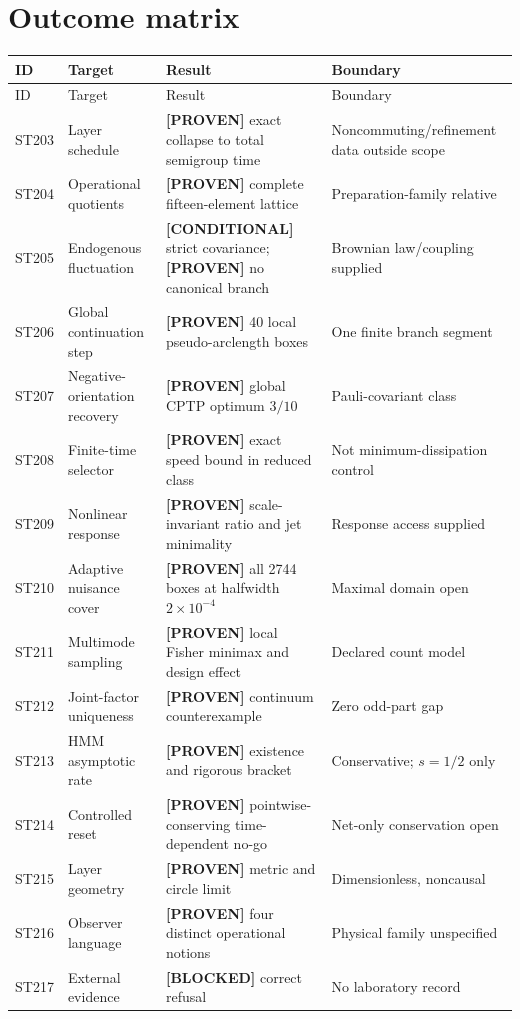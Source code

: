 \documentclass[11pt,a4paper]{article}
\newcommand{\proven}{\textcolor{green!40!black}{\textbf{[PROVEN]}}}
\newcommand{\conditional}{\textcolor{violet!65!black}{\textbf{[CONDITIONAL]}}}
\newcommand{\blocked}{\textcolor{orange!82!black}{\textbf{[BLOCKED]}}}
\begin{document}
\section{Outcome matrix}
\small
\begin{longtable}{@{}p{}p{}p{}p{}@{}}
\toprule ID & Target & Result & Boundary\\\midrule\endfirsthead
\toprule ID & Target & Result & Boundary\\\midrule\endhead
ST203 & Layer schedule & \proven{} exact collapse to total semigroup time & Noncommuting/refinement data outside scope\\
ST204 & Operational quotients & \proven{} complete fifteen-element lattice & Preparation-family relative\\
ST205 & Endogenous fluctuation & \conditional{} strict covariance; \proven{} no canonical branch & Brownian law/coupling supplied\\
ST206 & Global continuation step & \proven{} 40 local pseudo-arclength boxes & One finite branch segment\\
ST207 & Negative-orientation recovery & \proven{} global CPTP optimum $3/10$ & Pauli-covariant class\\
ST208 & Finite-time selector & \proven{} exact speed bound in reduced class & Not minimum-dissipation control\\
ST209 & Nonlinear response & \proven{} scale-invariant ratio and jet minimality & Response access supplied\\
ST210 & Adaptive nuisance cover & \proven{} all 2744 boxes at halfwidth $2\times10^{-4}$ & Maximal domain open\\
ST211 & Multimode sampling & \proven{} local Fisher minimax and design effect & Declared count model\\
ST212 & Joint-factor uniqueness & \proven{} continuum counterexample & Zero odd-part gap\\
ST213 & HMM asymptotic rate & \proven{} existence and rigorous bracket & Conservative; $s=1/2$ only\\
ST214 & Controlled reset & \proven{} pointwise-conserving time-dependent no-go & Net-only conservation open\\
ST215 & Layer geometry & \proven{} metric and circle limit & Dimensionless, noncausal\\
ST216 & Observer language & \proven{} four distinct operational notions & Physical family unspecified\\
ST217 & External evidence & \blocked{} correct refusal & No laboratory record\\
\bottomrule
\end{longtable}
\normalsize
\end{document}
